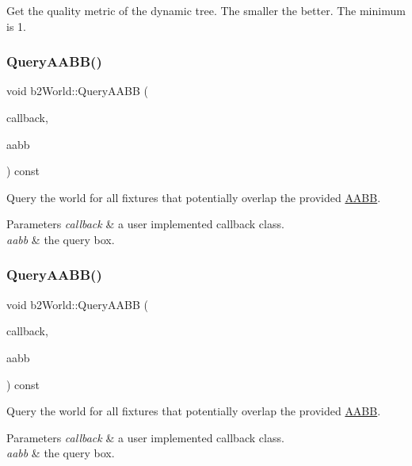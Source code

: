 Get the quality metric of the dynamic tree. The smaller the better. The minimum is 1. \mbox{\label{classb2World_ad169fae775be1e1f16386f7587786fa8}} 
\subsubsection{\texorpdfstring{Query\+A\+A\+B\+B()}{QueryAABB()}\hspace{0.1cm}{\footnotesize\ttfamily [1/2]}}
{\footnotesize\ttfamily void b2\+World\+::\+Query\+A\+A\+BB (\begin{DoxyParamCaption}\item[{\hyperlink{classb2QueryCallback}{b2\+Query\+Callback} $\ast$}]{callback,  }\item[{const \hyperlink{structb2AABB}{b2\+A\+A\+BB} \&}]{aabb }\end{DoxyParamCaption}) const}

Query the world for all fixtures that potentially overlap the provided \hyperlink{classAABB}{A\+A\+BB}. 
\begin{DoxyParams}{Parameters}
{\em callback} & a user implemented callback class. \\
\hline
{\em aabb} & the query box. \\
\hline
\end{DoxyParams}
\mbox{\label{classb2World_ad169fae775be1e1f16386f7587786fa8}} 
\subsubsection{\texorpdfstring{Query\+A\+A\+B\+B()}{QueryAABB()}\hspace{0.1cm}{\footnotesize\ttfamily [2/2]}}
{\footnotesize\ttfamily void b2\+World\+::\+Query\+A\+A\+BB (\begin{DoxyParamCaption}\item[{\hyperlink{classb2QueryCallback}{b2\+Query\+Callback} $\ast$}]{callback,  }\item[{const \hyperlink{structb2AABB}{b2\+A\+A\+BB} \&}]{aabb }\end{DoxyParamCaption}) const}

Query the world for all fixtures that potentially overlap the provided \hyperlink{classAABB}{A\+A\+BB}. 
\begin{DoxyParams}{Parameters}
{\em callback} & a user implemented callback class. \\
\hline
{\em aabb} & the query box. \\
\hline
\end{DoxyParams}
\mbox{\label{classb2World_aa9955d94a254253997daaf16ce77bab6}} 
